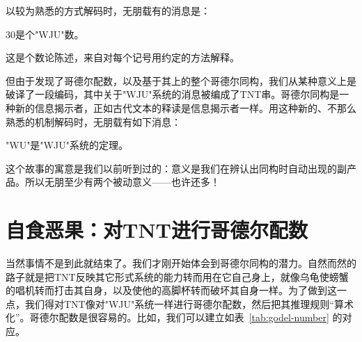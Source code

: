 以较为熟悉的方式解码时，无朋载有的消息是：
\begin{center}
$30$是个"WJU"数。
\end{center}
这是个数论陈述，来自对每个记号用约定的方法解释。

但由于发现了哥德尔配数，以及基于其上的整个哥德尔同构，我们从某种意义上是破译了一段编码，其中关于"WJU"系统的消息被编成了TNT串。哥德尔同构是一种新的信息揭示者，正如古代文本的释读是信息揭示者一样。用这种新的、不那么熟悉的机制解码时，无朋载有如下消息：

\begin{block}
"WU"是"WJU"系统的定理。
\end{block}

这个故事的寓意是我们以前听到过的：意义是我们在辨认出同构时自动出现的副产品。所以无朋至少有两个被动意义——也许还多！

\section{自食恶果：对TNT进行哥德尔配数}

当然事情不是到此就结束了。我们才刚开始体会到哥德尔同构的潜力。自然而然的路子就是把TNT反映其它形式系统的能力转而用在它自己身上，就像乌龟使螃蟹的唱机转而打击其自身，以及使他的高脚杯转而破坏其自身一样。为了做到这一点，我们得对TNT像对"WJU"系统一样进行哥德尔配数，然后把其推理规则“算术化”。哥德尔配数是很容易的。比如，我们可以建立如表~\ref{tab:godel-number} 的对应。

